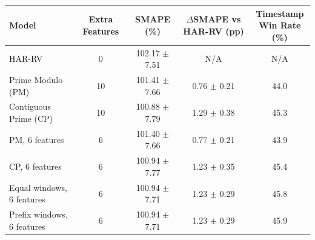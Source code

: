 \begin{tabular}{|l|c|c|c|c|}
\hline
Model & Extra Features & SMAPE (\%) & \shortstack{$\Delta$SMAPE\\vs HAR-RV (pp)} & \shortstack{Timestamp\\Win Rate (\%)} \\
\hline
HAR-RV & 0 & 102.17 $\pm$ 7.51 & N/A & N/A \\
Prime Modulo (PM) & 10 & 101.41 $\pm$ 7.66 & 0.76 $\pm$ 0.21 & 44.0 \\
Contiguous Prime (CP) & 10 & 100.88 $\pm$ 7.79 & 1.29 $\pm$ 0.38 & 45.3 \\
PM, 6 features & 6 & 101.40 $\pm$ 7.66 & 0.77 $\pm$ 0.21 & 43.9 \\
CP, 6 features & 6 & 100.94 $\pm$ 7.77 & 1.23 $\pm$ 0.35 & 45.4 \\
Equal windows, 6 features & 6 & 100.94 $\pm$ 7.71 & 1.23 $\pm$ 0.29 & 45.8 \\
Prefix windows, 6 features & 6 & 100.94 $\pm$ 7.71 & 1.23 $\pm$ 0.29 & 45.9 \\
\hline
\end{tabular}